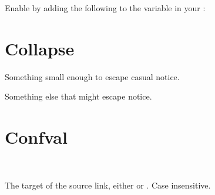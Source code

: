 \documentclass[letterpaper,10pt,english]{sphinxmanual}
\begin{document}
\label{\detokenize{installation:extensions-5}}

Enable  by adding the following
to the  variable in your :

\begin{sphinxVerbatim}[commandchars=\\\{\}]
  \PYG{p}{[}
    \PYG{p}{]}
\end{sphinxVerbatim}



\chapter{Collapse}
\label{\detokenize{collapse:collapse}}\label{\detokenize{collapse::doc}}
Something small enough to escape casual notice.

Something else that might escape notice.


\chapter{Confval}
\label{\detokenize{confval:confval}}\label{\detokenize{confval::doc}}

\vspace{5px}

\begin{fulllineitems}
\label{\detokenize{confval:confval-source_link_target}}~
\vspace{-45px}

\begin{DUlineblock}{0em}
\item[]  
\item[]  
\item[]  
\end{DUlineblock}

\vspace{-25px}

The target of the source link, either  or .
Case insensitive.

\end{fulllineitems}
\end{document}
